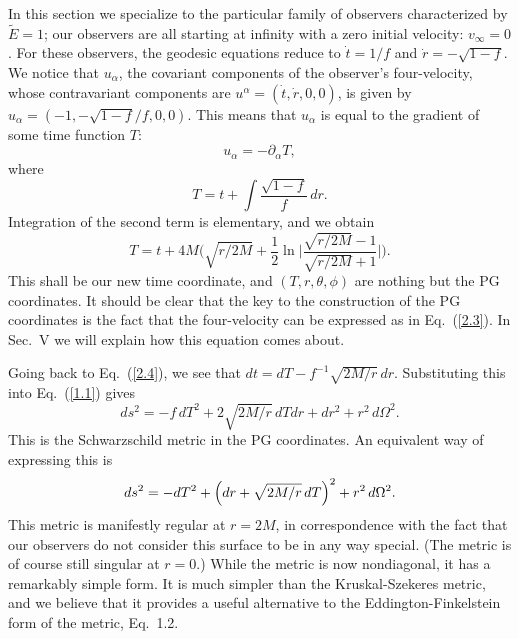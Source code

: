In this section we specialize to the particular family of observers
characterized by $\tilde{E} = 1$; our observers are all starting at
infinity with a zero initial velocity: $v_\infty = 0$. For these
observers, the geodesic equations reduce to $\dot{t} = 1/f$ and
$\dot{r} = -\sqrt{1-f}$. We notice that $u_\alpha$, the covariant
components of the observer's four-velocity, whose contravariant
components are $u^\alpha = (\dot{t}, \dot{r}, 0, 0)$, is given by
$u_\alpha = (-1,-\sqrt{1-f}/f,0,0)$. This means that $u_\alpha$ is
equal to the gradient of some time function $T$:   
\begin{equation}
u_\alpha = -\partial_\alpha T,
\label{2.3}
\end{equation}
where 
\begin{equation}
T = t + \int \frac{ \sqrt{1-f} }{f}\, dr. 
\label{2.4}
\end{equation}
Integration of the second term is elementary, and we obtain
\begin{equation}
T = t + 4M \biggl( \sqrt{r/2M} + \frac{1}{2} \ln 
\biggl| \frac{ \sqrt{r/2M} - 1 }{ \sqrt{r/2M} + 1 } \biggr| \biggr).  
\label{2.5}
\end{equation}
This shall be our new time coordinate, and $(T,r,\theta,\phi)$ are
nothing but the PG coordinates. It should be clear that the key to the
construction of the PG coordinates is the fact that the four-velocity
can be expressed as in Eq.~(\ref{2.3}). In Sec.~V we will explain how
this equation comes about. 

Going back to Eq.~(\ref{2.4}), we see that $dt = dT -
f^{-1}\sqrt{2M/r}\, dr$. Substituting this into Eq.~(\ref{1.1}) gives  
\begin{equation}
ds^2 = -f\, dT^2 + 2 \sqrt{2M/r}\, dT dr + dr^2 + r^2\, d\Omega^2. 
\label{2.6}
\end{equation}
This is the Schwarzschild metric in the PG coordinates. An equivalent
way of expressing this is 
\begin{equation}
ds^2 = -dT^2 + \Bigl( dr + \sqrt{2M/r}\, dT \Bigr)^2 + r^2\,
d\Omega^2.
\label{2.7}
\end{equation}
This metric is manifestly regular at $r = 2M$, in correspondence with
the fact that our observers do not consider this surface to be in any
way special. (The metric is of course still singular at $r=0$.) While
the metric is now nondiagonal, it has a remarkably simple form. It is
much simpler than the Kruskal-Szekeres metric, and we believe that it
provides a useful alternative to the Eddington-Finkelstein form of the
metric, Eq.~{1.2}. 

